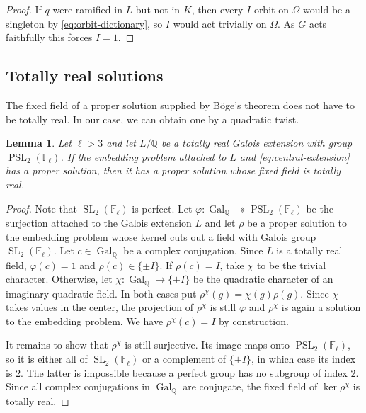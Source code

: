 \documentclass[10pt]{amsart}
\numberwithin{equation}{section}
\newcommand{\GQ}{\Gal_{\Q}}
\newtheorem{lemma}[theorem]{Lemma}
\theoremstyle{definition}
\theoremstyle{remark}
\newcommand{\F}{\mathbb{F}}
\newcommand{\Q}{\mathbb{Q}}
\newcommand{\SL}{\operatorname{SL}}
\newcommand{\PSL}{\operatorname{PSL}}
\newcommand{\Gal}{\operatorname{Gal}}
\begin{document}
\begin{proof}
If $q$ were ramified in $L$ but not in $K$, then every $I$-orbit on $\Omega$
would be a singleton by \eqref{eq:orbit-dictionary}, so $I$ would act
trivially on $\Omega$.  As $G$ acts faithfully this forces $I=1$.

\end{proof}

\subsection{Totally real solutions}\label{subsec:twist}
The fixed field of a proper solution supplied by B\"oge's theorem does not have to be totally real. In our case, we can obtain one by a quadratic twist.
\begin{lemma}\label{lem:central-twist}
Let $\ell>3$ and let $L/\Q$ be a totally real Galois extension with group
$\PSL_2(\F_\ell)$.  If the embedding problem attached to $L$ and
\eqref{eq:central-extension} has a proper solution, then it has a proper
solution whose fixed field is totally real.
\end{lemma}

\begin{proof}
Note that $\SL_2(\F_\ell)$ is perfect. 
Let $\varphi\colon\GQ\twoheadrightarrow \PSL_2(\F_\ell)$ be the surjection attached to the Galois extension
$L$ and let $\rho$ be a proper solution to the embedding problem whose kernel cuts out a field with Galois group $\SL_2(\F_\ell)$. Let $c\in\GQ$ be a complex
conjugation.  Since $L$ is a totally real field, $\varphi(c)=1$ and $\rho(c)\in\{\pm I\}$.  If
$\rho(c)=I$, take $\chi$ to be the trivial character. Otherwise, let
$\chi\colon\GQ\to\{\pm I\}$ be the quadratic character of an imaginary
quadratic field.  In both cases put $\rho^\chi(g)=\chi(g)\rho(g)$. Since $\chi$ takes values in the center, the projection of $\rho^\chi$ is still $\varphi$ and $\rho^\chi$ is again a solution to the embedding problem. We have $\rho^\chi(c)=I$ by construction. 

It remains to show that $\rho^\chi$ is still surjective.  Its image maps onto
$\PSL_2(\F_\ell)$, so it is either all of $\SL_2(\F_\ell)$ or a complement of
$\{\pm I\}$, in which case its index is $2$.  The latter is impossible because a perfect
group has no subgroup of index $2$. Since all complex conjugations in $\GQ$ are conjugate, the fixed
field of $\ker\rho^\chi$ is totally real. 
\end{proof}
\end{document}
